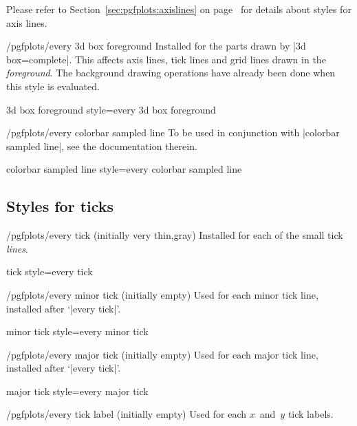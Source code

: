 \noindent Please refer to Section~\ref{sec:pgfplots:axislines} on
page~\pageref{pgfplots:page:axislines} for details about styles for axis lines.

\begin{stylekey}{/pgfplots/every 3d box foreground}
    Installed for the parts drawn by |3d box=complete|. This affects axis
    lines, tick lines and grid lines drawn in the \emph{foreground}. The
    background drawing operations have already been done when this style is
    evaluated.
\end{stylekey}

\pgfplotsshortstylekey 3d box foreground style=every 3d box foreground\pgfeov

\begin{stylekey}{/pgfplots/every colorbar sampled line}
    To be used in conjunction with |colorbar sampled line|, see the
    documentation therein.
\end{stylekey}

\pgfplotsshortstylekey colorbar sampled line style=every colorbar sampled line\pgfeov


\subsection*{Styles for ticks}

\begin{stylekey}{/pgfplots/every tick (initially very thin,gray)}
    Installed for each of the small tick \emph{lines}.
\end{stylekey}

\pgfplotsshortstylekey tick style=every tick\pgfeov

\begin{stylekey}{/pgfplots/every minor tick  (initially empty)}
    Used for each minor tick line, installed after `|every tick|'.
\end{stylekey}

\pgfplotsshortstylekey minor tick style=every minor tick\pgfeov

\begin{stylekey}{/pgfplots/every major tick (initially empty)}
    Used for each major tick line, installed after `|every tick|'.
\end{stylekey}

\pgfplotsshortstylekey major tick style=every major tick\pgfeov

\begin{stylekey}{/pgfplots/every tick label (initially empty)}
    Used for each $x$~and~$y$ tick labels.
\end{stylekey}


